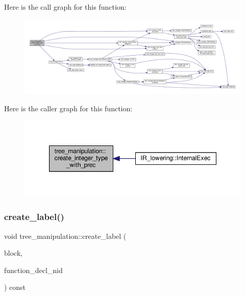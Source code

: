 Here is the call graph for this function\+:
\nopagebreak
\begin{figure}[H]
\begin{center}
\leavevmode
\includegraphics[width=350pt]{d0/d99/classtree__manipulation_a6ad2c7fadb2f6cdba0adc41e61863dbf_cgraph}
\end{center}
\end{figure}
Here is the caller graph for this function\+:
\nopagebreak
\begin{figure}[H]
\begin{center}
\leavevmode
\includegraphics[width=347pt]{d0/d99/classtree__manipulation_a6ad2c7fadb2f6cdba0adc41e61863dbf_icgraph}
\end{center}
\end{figure}
\mbox{\label{classtree__manipulation_a540fd36e16f7bc18c3f9e7a3737a3eb4}} 
\subsubsection{\texorpdfstring{create\+\_\+label()}{create\_label()}}
{\footnotesize\ttfamily void tree\+\_\+manipulation\+::create\+\_\+label (\begin{DoxyParamCaption}\item[{const bloc\+Ref \&}]{block,  }\item[{unsigned int}]{function\+\_\+decl\+\_\+nid }\end{DoxyParamCaption}) const}



